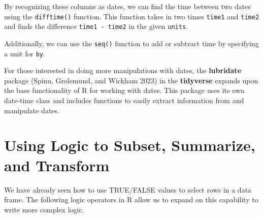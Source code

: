\documentclass[
  letterpaper,
]{latex/krantz}
\makeatletter
\newenvironment{Shaded}{\begin{snugshade}}{\end{snugshade}}
\newcommand{\AttributeTok}[1]{\textcolor[rgb]{0.40,0.45,0.13}{#1}}
\newcommand{\CommentTok}[1]{\textcolor[rgb]{0.37,0.37,0.37}{#1}}
\newcommand{\DecValTok}[1]{\textcolor[rgb]{0.68,0.00,0.00}{#1}}
\newcommand{\FunctionTok}[1]{\textcolor[rgb]{0.28,0.35,0.67}{#1}}
\newcommand{\NormalTok}[1]{\textcolor[rgb]{0.00,0.23,0.31}{#1}}
\newcommand{\SpecialCharTok}[1]{\textcolor[rgb]{0.37,0.37,0.37}{#1}}
\newcommand{\StringTok}[1]{\textcolor[rgb]{0.13,0.47,0.30}{#1}}
\newenvironment{kframe}{%
\medskip{}
\setlength{\fboxsep}{.8em}
 \def\at@end@of@kframe{}%
 \ifinner\ifhmode%
  \def\at@end@of@kframe{\end{minipage}}%
  \begin{minipage}{\columnwidth}%
 \fi\fi%
 \def\FrameCommand##1{\hskip\@totalleftmargin \hskip-\fboxsep
 \colorbox{shadecolor}{##1}\hskip-\fboxsep
     \hskip-\linewidth \hskip-\@totalleftmargin \hskip\columnwidth}%
 \MakeFramed {\advance\hsize-\width
   \@totalleftmargin\z@ \linewidth\hsize
   \@setminipage}}%
 {\par\unskip\endMakeFramed%
 \at@end@of@kframe}
\renewenvironment{Shaded}{\begin{kframe}}{\end{kframe}}
\makeatother
\begin{document}
By recognizing these columns as dates, we can find the time between two
dates using the
\texttt{difftime()}
function. This function takes in two times \texttt{time1} and
\texttt{time2} and finds the difference \texttt{time1\ -\ time2} in the
given \texttt{units}.

\begin{Shaded}
\end{Shaded}

Additionally, we can use the \texttt{seq()} function to add or subtract
time by specifying a unit for \texttt{by}.

\begin{Shaded}
\end{Shaded}

For those interested in doing more manipulations with dates, the
\textbf{lubridate} package (Spinu,
Grolemund, and Wickham 2023) in the \textbf{tidyverse} expands upon the
base functionality of R for working with dates. This package uses its
own date-time class and includes functions to easily extract information
from and manipulate dates.

\section{\texorpdfstring{Using Logic to Subset, Summarize, and Transform
}{Using Logic to Subset, Summarize, and Transform }}\label{using-logic-to-subset-summarize-and-transform}

We have already seen how to use TRUE/FALSE values to select rows in a
data frame. The following logic operators in R allow us to expand on
this capability to write more complex logic.
\end{document}

